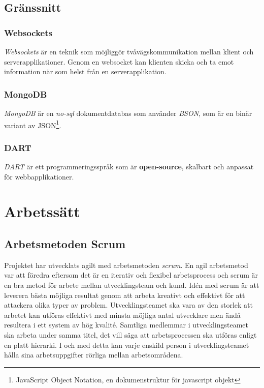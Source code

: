 \documentclass[a4paper,12pt,oneside,final]{extbook}
\begin{document}
\section{Gränssnitt}
\subsection{Websockets}
\emph{Websockets} är en teknik som möjliggör tvåvägskommunikation mellan klient och serverapplikationer. Genom en websocket kan klienten skicka och ta emot information när som helst från en serverapplikation. %

\subsection{MongoDB}
\emph{MongoDB} är en \emph{no-sql} dokumentdatabas som använder \emph{BSON}, som är en binär variant av JSON\footnote{JavaScript Object Notation, en dokumenstruktur för javascript objekt}.

\subsection{DART}
\emph{DART} är ett programmeringsspråk som är \textbf{open-source}, skalbart och anpassat för webbapplikationer.


\chapter{Arbetssätt}
\section{Arbetsmetoden Scrum}
Projektet har utvecklats agilt med arbetsmetoden \emph{scrum}. En agil arbetsmetod var att föredra eftersom det är en iterativ och flexibel arbetsprocess och scrum är en bra metod för arbete mellan utvecklingsteam och kund. Idén med scrum är att leverera bästa möjliga resultat genom att arbeta kreativt och effektivt för att attackera olika typer av problem. Utvecklingsteamet ska vara av den storlek att arbetet kan utföras effektivt med minsta möjliga antal utvecklare men ändå resultera i ett system av hög kvalité. Samtliga medlemmar i utvecklingsteamet ska arbeta under samma titel, det vill säga att arbetsprocessen ska utföras enligt en platt hierarki. I och med detta kan varje enskild person i utvecklingsteamet hålla sina arbetsuppgifter rörliga mellan arbetsområdena.
\end{document}
